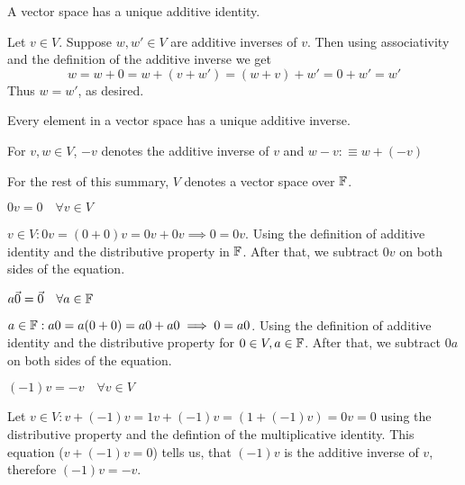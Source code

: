 \setcounter{thm}{25}
\begin{thm} 
  \label{thm: unique additive identity}
  A vector space has a unique additive identity.
\end{thm}
\begin{prf}
  Let $v\in V.$ Suppose $w,w' \in V$ are additive inverses of $v$. Then using associativity and the definition of the additive inverse we get
  \begin{equation}
    w = w + 0 = w + (v + w') = (w+v) + w' = 0 + w' = w'
  \end{equation}
  Thus $w = w'$, as desired.
\end{prf}

\begin{thm} 
  Every element in a vector space has a unique additive inverse.
\end{thm}

\begin{mydef}
  For $v,w\in V$, $-v$ denotes the additive inverse of $v$ and $w-v:\equiv w+(-v)$
\end{mydef}

\begin{mydef}
  For the rest of this summary, $V$ denotes a vector space over $\mathbb{F}$.
\end{mydef}

\begin{thm} 
  $0v = 0 \quad \forall v\in V$
\end{thm}
\begin{prf}
  $v \in V: 0v = (0+0)v = 0v +0v \implies 0 = 0v$. Using the definition of additive identity and the distributive property in $\mathbb{F}$. After that, we subtract $0v$ on both sides of the equation.
\end{prf}

\begin{thm} 
  $a \vec0= \vec0 \quad \forall a\in \mathbb{F}$
\end{thm}
\begin{prf}
  $a \in \mathbb{F}: a0 = a(0+0) = a0 + a0 \implies 0 = a0$. Using the definition of additive identity and the distributive property for $0 \in V, a \in \mathbb{F}$. After that, we subtract $0a$ on both sides of the equation.
\end{prf}

\begin{thm} 
  \label{thm: minus one times a vector}
  $(-1)v = -v \quad \forall v\in V$
\end{thm}
\begin{prf}
  Let $v \in V: v + (-1)v = 1v + (-1)v = (1 + (-1)v) = 0v = 0$ using the distributive property and the defintion of the multiplicative identity. This equation ($v+(-1)v=0$) tells us, that $(-1)v$ is the additive inverse of $v$, therefore $(-1)v = -v$.
\end{prf}

